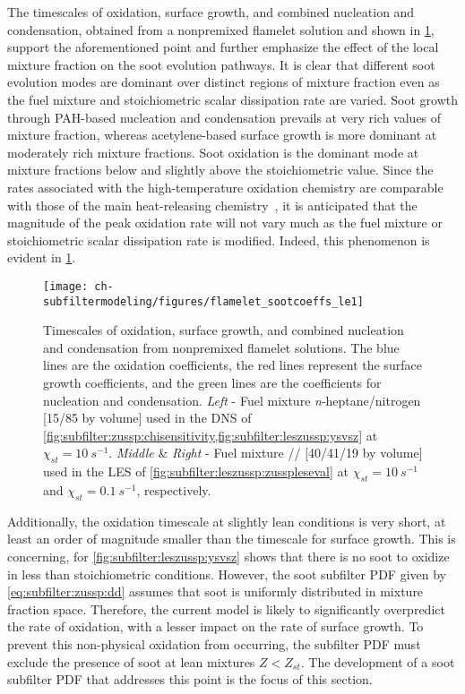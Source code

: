The timescales of oxidation, surface growth, and combined nucleation and condensation, obtained from a nonpremixed flamelet solution and shown in \cref{fig:subfilter:leszussp:kvsz}, support the aforementioned point and further emphasize the effect of the local mixture fraction on the soot evolution pathways. It is clear that different soot evolution modes are dominant over distinct regions of mixture fraction even as the fuel mixture and stoichiometric scalar dissipation rate are varied. Soot growth through PAH-based nucleation and condensation prevails at very rich values of mixture fraction, whereas acetylene-based surface growth is more dominant at moderately rich mixture fractions. Soot oxidation is the dominant mode at mixture fractions below and slightly above the stoichiometric value. Since the rates associated with the high-temperature oxidation chemistry are comparable with those of the main heat-releasing chemistry~\cite{guo2016}, it is anticipated that the magnitude of the peak oxidation rate will not vary much as the fuel mixture or stoichiometric scalar dissipation rate is modified. Indeed, this phenomenon is evident in \cref{fig:subfilter:leszussp:kvsz}.

\begin{figure}[htb]
  \centering
  \texttt{[image: ch-subfiltermodeling/figures/flamelet\_sootcoeffs\_le1]}
  \caption[Soot Growth and Oxidation Timescales, 1/\texorpdfstring{$\tau$}{t} vs. \texorpdfstring{$Z$}{Z}]{Timescales of oxidation, surface growth, and combined nucleation and condensation from nonpremixed flamelet solutions. The blue lines are the oxidation coefficients, the red lines represent the surface growth coefficients, and the green lines are the coefficients for nucleation and condensation. \textit{Left} - Fuel mixture \textit{n}-heptane/nitrogen [15/85 by volume] used in the DNS of \cref{fig:subfilter:zussp:chisensitivity,fig:subfilter:leszussp:ysvsz} at $\chi_{st} = 10\ s^{-1}$. \textit{Middle} \& \textit{Right} - Fuel mixture // [40/41/19 by volume] used in the LES of \cref{fig:subfilter:leszussp:zusspleseval} at $\chi_{st} = 10\ s^{-1}$ and $\chi_{st} = 0.1\ s^{-1}$, respectively.}
  \label{fig:subfilter:leszussp:kvsz}
\end{figure}

Additionally, the oxidation timescale at slightly lean conditions is very short, at least an order of magnitude smaller than the timescale for surface growth. This is concerning, for \cref{fig:subfilter:leszussp:ysvsz} shows that there is no soot to oxidize in less than stoichiometric conditions. However, the soot subfilter PDF given by \cref{eq:subfilter:zussp:dd} assumes that soot is uniformly distributed in mixture fraction space. Therefore, the current model is likely to significantly overpredict the rate of oxidation, with a lesser impact on the rate of surface growth. To prevent this non-physical oxidation from occurring, the subfilter PDF must exclude the presence of soot at lean mixtures $Z < Z_{st}$. The development of a soot subfilter PDF that addresses this point is the focus of this section.


